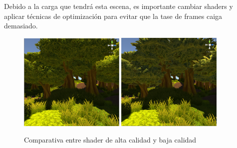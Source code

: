 \quad Debido a la carga que tendrá esta escena, es importante cambiar shaders y aplicar técnicas de optimización para evitar que la tase de frames caiga demasiado.

\begin{figure}[htb]
	\centering
	\includegraphics[width=0.45\textwidth]{./imagenes/highShadders}
	\includegraphics[width=0.45\textwidth]{./imagenes/lowShadders}
	\caption{Comparativa entre shader de alta calidad y baja calidad}
\end{figure}


\newpage


